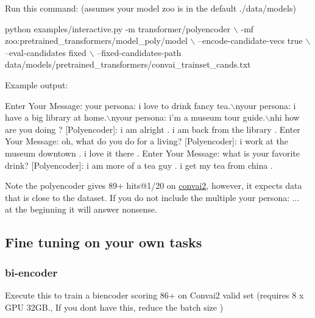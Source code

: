 Run this command\+: (assumes your model zoo is in the default ./data/models) 
\begin{DoxyCode}
python examples/interactive.py -m transformer/polyencoder \(\backslash\)
    -mf zoo:pretrained\_transformers/model\_poly/model \(\backslash\)
    --encode-candidate-vecs true \(\backslash\)
    --eval-candidates fixed  \(\backslash\)
    --fixed-candidates-path data/models/pretrained\_transformers/convai\_trainset\_cands.txt
\end{DoxyCode}


Example output\+: 
\begin{DoxyCode}
Enter Your Message: your persona: i love to drink fancy tea.\(\backslash\)nyour persona: i have a big library at
       home.\(\backslash\)nyour persona: i'm a museum tour guide.\(\backslash\)nhi how are you doing ?
[Polyencoder]: i am alright . i am back from the library .
Enter Your Message: oh, what do you do for a living?
[Polyencoder]: i work at the museum downtown . i love it there .
Enter Your Message: what is your favorite drink?
[Polyencoder]: i am more of a tea guy . i get my tea from china .
\end{DoxyCode}


Note the polyencoder gives 89+ hits@1/20 on \hyperlink{namespaceconvai2}{convai2}, however, it expects data that is close to the dataset. If you do not include the multiple \textquotesingle{}your persona\+: ...~\newline
\textquotesingle{} at the beginning it will answer nonsense.

\subsection*{Fine tuning on your own tasks}

\subsubsection*{bi-\/encoder}

Execute this to train a biencoder scoring 86+ on Convai2 valid set (requires 8 x G\+PU 32\+GB., If you don\textquotesingle{}t have this, reduce the batch size )


